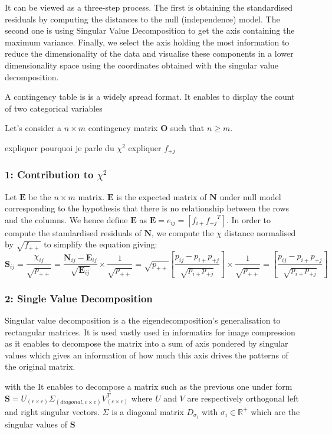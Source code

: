 \documentclass{article}
\begin{document}
It can be viewed as a three-step process. The first is obtaining the standardised residuals by computing the distances to the null (independence) model. The second one is using Singular Value Decomposition to get the axis containing the maximum variance. Finally, we select the axis holding the most information to reduce the dimensionality of the data and visualise these components in a lower dimensionality space using the coordinates obtained with the singular value decomposition.




A contingency table is is a widely spread format. It enables to display the count of two categorical variables

Let's consider a $n \times m$ contingency matrix $\textbf{O}$ such that $n\geq m$.

expliquer pourquoi je parle du $\chi^2$
expliquer ${f_{+j}}$

\subsubsection{1: Contribution to $\chi^2$}

Let $\textbf{E}$ be the $n\times m$ matrix. $\textbf{E}$ is the expected matrix of  $\textbf{N}$ under null model corresponding to the hypothesis that there is no relationship between the rows and the columns. We hence define $\textbf{E}$ as $\textbf{E} = e_{ij} = [f_{i+}{f_{+j}}^T]$.
In order to compute the standardised residuals of $\textbf{N}$, we compute the $\chi$ distance normalised by $\sqrt{f_{++}}$ to simplify the equation giving: 
$$\textbf{S}_{ij} = \frac{\chi_{ij}}{\sqrt{p_{++}}} = \frac{\textbf{N}_{ij} -  \textbf{E}_{ij}}{\sqrt{\textbf{E}_{ij}}} \times \frac{1}{\sqrt{p_{++}}} = \sqrt{p_{++}} \left[ \frac{p_{ij} - p_{i+}p_{+j}}{\sqrt{p_{i+}p_{+j}}} \right] \times \frac{1}{\sqrt{p_{++}}} = \left[ \frac{p_{ij} - p_{i+}p_{+j}}{\sqrt{p_{i+}p_{+j}}} \right]$$ 
\subsubsection{2: Single Value Decomposition}

Singular value decomposition is a the eigendecomposition's generalisation to rectangular matrices. It is used vastly used in informatics for image compression as it enables to decompose the matrix into a sum of axis pondered by singular values which gives an information of how much this axis drives the patterns of the original matrix.

with the  It enables to decompose a matrix such as the previous one under form  $\textbf{S} = U_{(r\times c)} \Sigma_{(diagonal, c\times c)} V_{(c \times c)}^T$ where $U$ and $V$ are respectively orthogonal left and right singular vectors. $\Sigma$ is a diagonal matrix $D_{\sigma_i}$ with $\sigma_i \in \mathbb{R}^+$ which are the singular values of $\textbf{S}$
\end{document}
